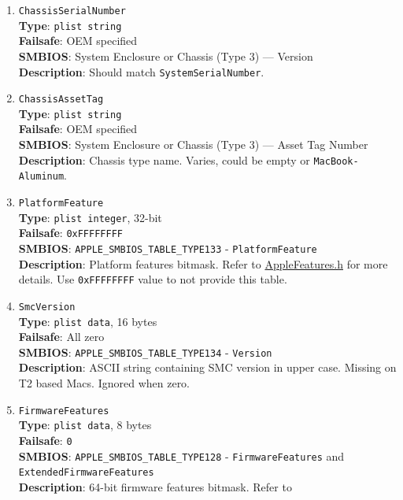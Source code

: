 \documentclass[]{article}
\begin{document}
\begin{enumerate}
\item
  \texttt{ChassisSerialNumber}\\
  \textbf{Type}: \texttt{plist\ string}\\
  \textbf{Failsafe}: OEM specified\\
  \textbf{SMBIOS}: System Enclosure or Chassis (Type 3) --- Version\\
  \textbf{Description}: Should match \texttt{SystemSerialNumber}.
\item
  \texttt{ChassisAssetTag}\\
  \textbf{Type}: \texttt{plist\ string}\\
  \textbf{Failsafe}: OEM specified\\
  \textbf{SMBIOS}: System Enclosure or Chassis (Type 3) --- Asset Tag
  Number\\
  \textbf{Description}: Chassis type name. Varies, could be empty or
  \texttt{MacBook-Aluminum}.
\item
  \texttt{PlatformFeature}\\
  \textbf{Type}: \texttt{plist\ integer}, 32-bit\\
  \textbf{Failsafe}: \texttt{0xFFFFFFFF}\\
  \textbf{SMBIOS}: \texttt{APPLE\_SMBIOS\_TABLE\_TYPE133} -
  \texttt{PlatformFeature}\\
  \textbf{Description}: Platform features bitmask. Refer to
  \href{https://github.com/acidanthera/OpenCorePkg/blob/master/Include/Apple/IndustryStandard/AppleFeatures.h}{AppleFeatures.h}
  for more details. Use \texttt{0xFFFFFFFF} value to not provide this table.
\item
  \texttt{SmcVersion}\\
  \textbf{Type}: \texttt{plist\ data}, 16 bytes\\
  \textbf{Failsafe}: All zero\\
  \textbf{SMBIOS}: \texttt{APPLE\_SMBIOS\_TABLE\_TYPE134} - \texttt{Version}\\
  \textbf{Description}: ASCII string containing SMC version in upper case.
  Missing on T2 based Macs. Ignored when zero.
\item
  \texttt{FirmwareFeatures}\\
  \textbf{Type}: \texttt{plist\ data}, 8 bytes\\
  \textbf{Failsafe}: \texttt{0}\\
  \textbf{SMBIOS}: \texttt{APPLE\_SMBIOS\_TABLE\_TYPE128} -
  \texttt{FirmwareFeatures} and \texttt{ExtendedFirmwareFeatures}\\
  \textbf{Description}: 64-bit firmware features bitmask. Refer to

\end{enumerate}
\end{document}
